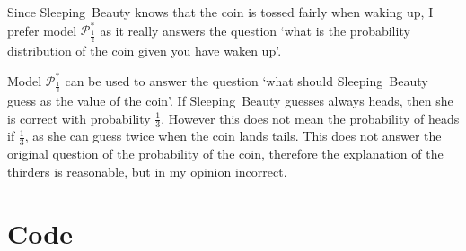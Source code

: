 \documentclass[twoside,a4paper]{article}
\theoremstyle{plain}
\theoremstyle{definition}
\theoremstyle{remark}
\numberwithin{equation}{section}
\DeclareMathOperator{\1}{\mathbbm{1}}
\newcommand{\Pmod}{\mathcal{P}^*}
\begin{document}
Since Sleeping~Beauty knows that the coin is tossed fairly when waking up, I prefer model $\Pmod_{\frac{1}{2}}$ as it really answers the question `what is the probability distribution of the coin given you have waken up'.

Model $\Pmod_{\frac{1}{3}}$ can be used to answer the question `what should Sleeping~Beauty guess as the value of the coin'. If Sleeping~Beauty guesses always heads, then she is correct with probability $\frac{1}{3}$. However this does not mean the probability of heads if $\frac{1}{3}$, as she can guess twice when the coin lands tails. This does not answer the original question of the probability of the coin, therefore the explanation of the thirders is reasonable, but in my opinion incorrect.




\newpage
\appendix
\section{Code}
\end{document}
